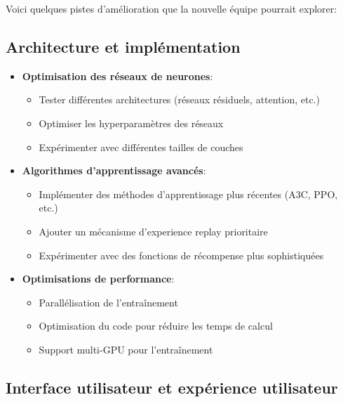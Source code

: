 \documentclass[]{article}
\begin{document}
Voici quelques pistes d'amélioration que la nouvelle équipe pourrait explorer:

\subsection{Architecture et implémentation}

\begin{itemize}
  \item \textbf{Optimisation des réseaux de neurones}:
    \begin{itemize}
      \item Tester différentes architectures (réseaux résiduels, attention, etc.)
      \item Optimiser les hyperparamètres des réseaux
      \item Expérimenter avec différentes tailles de couches
    \end{itemize}

  \item \textbf{Algorithmes d'apprentissage avancés}:
    \begin{itemize}
      \item Implémenter des méthodes d'apprentissage plus récentes (A3C, PPO, etc.)
      \item Ajouter un mécanisme d'experience replay prioritaire
      \item Expérimenter avec des fonctions de récompense plus sophistiquées
    \end{itemize}

  \item \textbf{Optimisations de performance}:
    \begin{itemize}
      \item Parallélisation de l'entraînement
      \item Optimisation du code pour réduire les temps de calcul
      \item Support multi-GPU pour l'entraînement
    \end{itemize}
\end{itemize}

\subsection{Interface utilisateur et expérience utilisateur}
\end{document}
